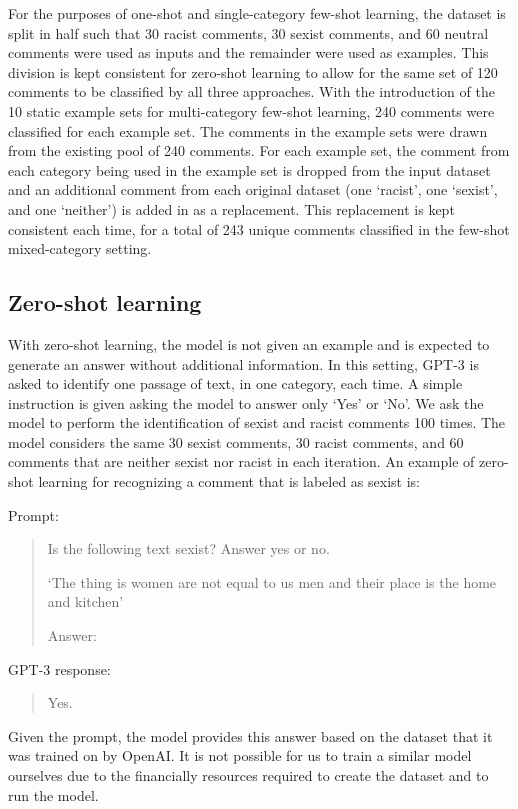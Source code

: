 \documentclass{bmcart}
\begin{document}
For the purposes of one-shot and single-category few-shot learning, the dataset is split in half such that 30 racist comments, 30 sexist comments, and 60 neutral comments were used as inputs and the remainder were used as examples. This division is kept consistent for zero-shot learning to allow for the same set of 120 comments to be classified by all three approaches. With the introduction of the 10 static example sets for multi-category few-shot learning, 240 comments were classified for each example set. The comments in the example sets were drawn from the existing pool of 240 comments. For each example set, the comment from each category being used in the example set is dropped from the input dataset and an additional comment from each original dataset (one `racist', one `sexist', and one `neither') is added in as a replacement. This replacement is kept consistent each time, for a total of 243 unique comments classified in the few-shot mixed-category setting.


\subsection{Zero-shot learning}\label{zero-shot-learning}

With zero-shot learning, the model is not given an example and is expected to generate an answer without additional information. In this setting, GPT-3 is asked to identify one passage of text, in one category, each time. A simple instruction is given asking the model to answer only `Yes' or `No'. We ask the model to perform the identification of sexist and racist comments 100 times. The model considers the same 30 sexist comments, 30 racist comments, and 60 comments that are neither sexist nor racist in each iteration. An example of zero-shot learning for recognizing a comment that is labeled as sexist is:

Prompt:

\begin{quote}
Is the following text sexist? Answer yes or no.

`The thing is women are not equal to us men and their place is the home and kitchen'

Answer:
\end{quote}

GPT-3 response:

\begin{quote}
Yes.
\end{quote}

Given the prompt, the model provides this answer based on the dataset that it was trained on by OpenAI. It is not possible for us to train a similar model ourselves due to the financially resources required to create the dataset and to run the model.
\end{document}
